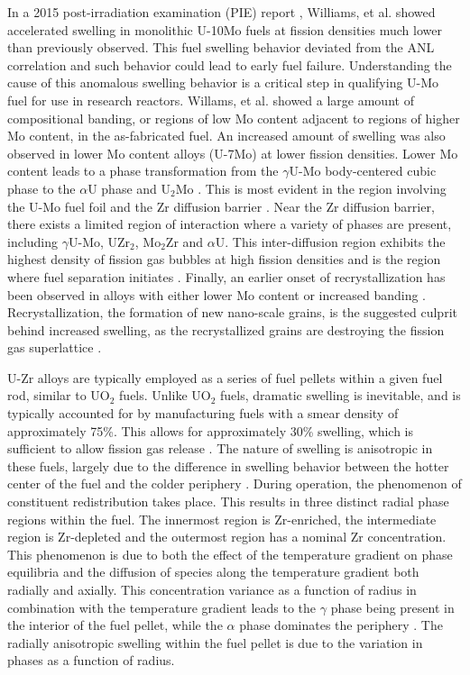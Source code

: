 \documentclass[review]{elsarticle}
\begin{document}
In a 2015 post-irradiation examination (PIE) report \cite{afip6report}, Williams, et al. showed accelerated swelling in monolithic U-10Mo fuels at fission densities much lower than previously observed. This fuel swelling behavior deviated from the ANL correlation and such behavior could lead to early fuel failure. Understanding the cause of this anomalous swelling behavior is a critical step in qualifying U-Mo fuel for use in research reactors. Willams, et al. \cite{afip6report} showed a large amount of compositional banding, or regions of low Mo content adjacent to regions of higher Mo content, in the as-fabricated fuel. An increased amount of swelling was also observed in lower Mo content alloys (U-7Mo) \cite{vandenberghe2014} at lower fission densities. Lower Mo content leads to a phase transformation from the $\gamma$U-Mo body-centered cubic phase to the $\alpha$U phase and U$_{2}$Mo \cite{janfong2014}. This is most evident in the region involving the U-Mo fuel foil and the Zr diffusion barrier \cite{park2015}. Near the Zr diffusion barrier, there exists a limited region of interaction where a variety of phases are present, including $\gamma$U-Mo, UZr$_{2}$, Mo$_{2}$Zr and $\alpha$U. This inter-diffusion region exhibits the highest density of fission gas bubbles at high fission densities and is the region where fuel separation initiates \cite{rertr12}. Finally, an earlier onset of recrystallization has been observed in alloys with either lower Mo content or increased banding \cite{kim2013A}. Recrystallization, the formation of new nano-scale grains, is the suggested culprit behind increased swelling, as the recrystallized grains are destroying the fission gas superlattice \cite{vandenberghe2008}. 

U-Zr alloys are typically employed as a series of fuel pellets within a given fuel rod, similar to UO$_{2}$ fuels. Unlike UO$_{2}$ fuels, dramatic swelling is inevitable, and is typically accounted for by manufacturing fuels with a smear density of approximately 75{\%}. This allows for approximately 30\% swelling, which is sufficient to allow fission gas release \cite{beck1968}. The nature of swelling is anisotropic in these fuels, largely due to the difference in swelling behavior between the hotter center of the fuel and the colder periphery \cite{hofman1990}. During operation, the phenomenon of constituent redistribution takes place. This results in three distinct radial phase regions within the fuel. The innermost region is Zr-enriched, the intermediate region is Zr-depleted and the outermost region has a nominal Zr concentration. This phenomenon is due to both the effect of the temperature gradient on phase equilibria and the diffusion of species along the temperature gradient both radially and axially. This concentration variance as a function of radius in combination with the temperature gradient leads to the $\gamma$ phase being present in the interior of the fuel pellet, while the $\alpha$ phase dominates the periphery \cite{kobayashi1990, kim2004}. The radially anisotropic swelling within the fuel pellet is due to the variation in phases as a function of radius.
\end{document}
